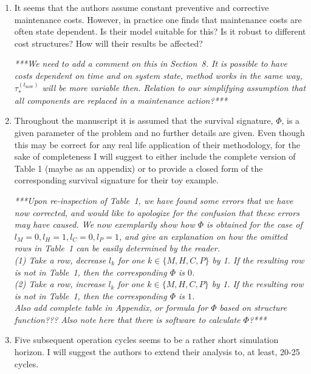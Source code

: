 \documentclass[authoryear]{elsarticle}
\def\tnow{t_\text{now}}
\newcommand{\tausnow}{\tau_*^{(\tnow)}}
\begin{document}
\begin{enumerate}
\item It seems that the authors assume constant preventive and corrective maintenance costs. However, in practice one finds that maintenance costs are often state dependent. Is their model suitable for this? Is it robust to different cost structures? How will their results be affected?

\smallskip

\emph{***We need to add a comment on this in Section~8. It is possible to have costs dependent on time and on system state,
method works in the same way, $\tausnow$ will be more variable then.
Relation to our simplifying assumption that all components are replaced in a maintenance action?***}

\item Throughout the manuscript it is assumed that the survival signature, $\Phi$, is a given parameter of the problem and no further details are given. Even though this may be correct for any real life application of their methodology, for the sake of completeness I will suggest to either include the complete version of Table 1 (maybe as an appendix) or to provide a closed form of the corresponding survival signature for their toy example.

\smallskip

\emph{***Upon re-inspection of Table~1, we have found some errors that we have now corrected,
and would like to apologize for the confusion that these errors may have caused.
We now exemplarily show how $\Phi$ is obtained for the case of $l_M = 0, l_H = 1, l_C = 0, l_P = 1$,
and give an explanation on how the omitted rows in Table~1 can be easily determined by the reader.\\
{\scriptsize
(1) Take a row, decrease $l_k$ for one $k \in \{M, H, C, P\}$ by 1.
If the resulting row is not in Table~1, then the corresponding $\Phi$ is $0$.\\
(2) Take a row, increase $l_k$ for one $k \in \{M, H, C, P\}$ by 1.
If the resulting row is not in Table~1, then the corresponding $\Phi$ is $1$.}\\
Also add complete table in Appendix, or formula for $\Phi$ based on structure function???
Also note here that there is software to calculate $\Phi$?***}

\item Five subsequent operation cycles seems to be a rather short simulation horizon. I will suggest the authors to extend their analysis to, at least, 20-25 cycles.

\smallskip


\end{enumerate}
\end{document}
